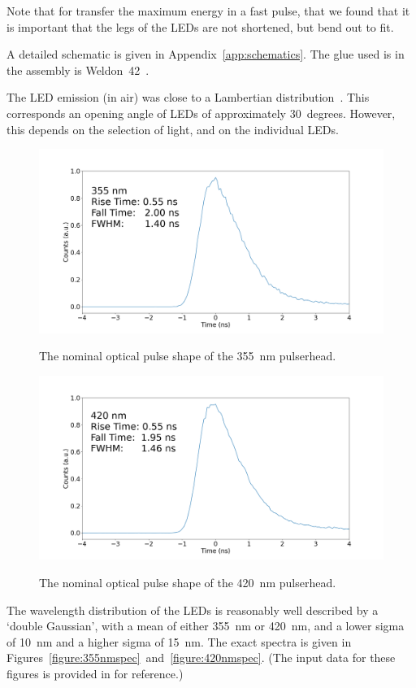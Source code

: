 Note that for transfer the maximum energy in a fast pulse, that we found that it is important that the legs of the LEDs are not shortened, but bend out to fit.

A detailed schematic is given in Appendix~\ref{app:schematics}. The glue used is in the assembly is Weldon~42~\cite{WELDON}.

The LED emission (in air) was close to a Lambertian distribution~\cite{LAMBERTIAN}. This corresponds an opening angle of LEDs of approximately 30~degrees. However, this depends on the selection of light, and on the individual LEDs. 

\begin{figure}
\begin{center}	
  \includegraphics[width=0.60\linewidth]{figures/355_nm_2.png}
  \caption{The nominal optical pulse shape of the 355~nm pulserhead.}
  \label{figure:355nmperf}
  \includegraphics[width=0.60\linewidth]{figures/420_nm_2.png}
  \caption{The nominal optical pulse shape of the 420~nm pulserhead.}
  \label{figure:420nmperf}
\end{center}
\end{figure}

The wavelength distribution of the LEDs is reasonably well described by a `double Gaussian', with a mean of either 355~nm or 420~nm, and a lower sigma of 10~nm and a higher sigma of 15~nm. The exact spectra is given in Figures~\ref{figure:355nmspec}~and~\ref{figure:420nmspec}. (The input data for these figures is provided in \label{app:led_spectra} for reference.)

%
%

